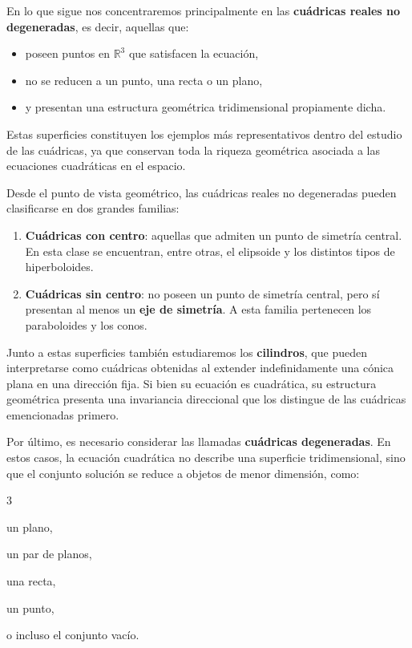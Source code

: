 \documentclass[11pt]{article}
\begin{document}
En lo que sigue nos concentraremos principalmente en las \textbf{cuádricas reales no degeneradas}, es decir, aquellas que:

\begin{itemize}
    \item poseen puntos en $\mathbb{R}^3$ que satisfacen la ecuación,
    \item no se reducen a un punto, una recta o un plano,
    \item y presentan una estructura geométrica tridimensional propiamente dicha.
\end{itemize}

Estas superficies constituyen los ejemplos más representativos dentro del estudio de las cuádricas, ya que conservan toda la riqueza geométrica asociada a las ecuaciones cuadráticas en el espacio.

Desde el punto de vista geométrico, las cuádricas reales no degeneradas pueden clasificarse en dos grandes familias:

\begin{enumerate}
    \item \textbf{Cuádricas con centro}: aquellas que admiten un punto de simetría central.  
    En esta clase se encuentran, entre otras, el elipsoide y los distintos tipos de hiperboloides.

    \item \textbf{Cuádricas sin centro}: no poseen un punto de simetría central, pero sí presentan al menos un \textbf{eje de simetría}.  
    A esta familia pertenecen los paraboloides y los conos.
\end{enumerate}

Junto a estas superficies  también estudiaremos  los \textbf{cilindros}, que pueden interpretarse como cuádricas obtenidas al extender indefinidamente una cónica plana en una dirección fija. Si bien su ecuación es cuadrática, su estructura geométrica presenta una invariancia direccional que los distingue de las cuádricas emencionadas primero.

Por último, es necesario considerar las llamadas \textbf{cuádricas degeneradas}. En estos casos, la ecuación cuadrática no describe una superficie tridimensional, sino que el conjunto solución se reduce a objetos de menor dimensión, como:
\begin{itemize}
\begin{multicols}{3}
    \item un plano,
    \item un par de planos,
    \item una recta,
    \item un punto,
    \item o incluso el conjunto vacío.
\end{multicols}
\end{itemize}
\end{document}
